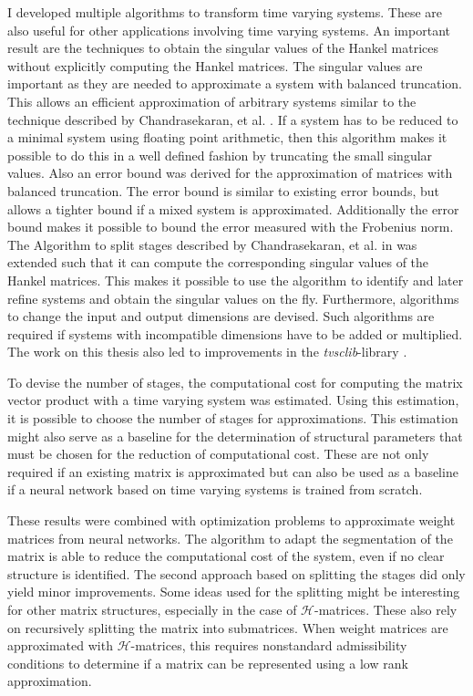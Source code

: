 \documentclass[numbers=noenddot,doctype=mastersthesis,BCOR=15mm,biblatex]{ldvbook}%
\begin{document}
I developed multiple algorithms to transform time varying systems.
These are also useful for other applications involving time varying systems.
An important result are the techniques to obtain the singular values of the Hankel matrices without explicitly computing the Hankel matrices.
The singular values are important as they are needed to approximate a system with balanced truncation.
This allows an efficient approximation of arbitrary systems similar to the technique described by Chandrasekaran, et al. \cite{chandrasekaran_fast_2005}.
If a system has to be reduced to a minimal system using floating point arithmetic, then this algorithm makes it possible to do this in a well defined fashion by truncating the small singular values.
Also an error bound was derived for the approximation of matrices with balanced truncation.
The error bound is similar to existing error bounds, but allows a tighter bound if a mixed system is approximated.
Additionally the error bound makes it possible to bound the error measured with the Frobenius norm.
The Algorithm to split stages described by Chandrasekaran, et al. in \cite{chandrasekaran_fast_2005} was extended such that it can compute the corresponding singular values of the Hankel matrices.
This makes it possible to use the algorithm to identify and later refine systems and obtain the singular values on the fly.
Furthermore, algorithms to change the input and output dimensions are devised. 
Such algorithms are required if systems with incompatible dimensions have to be added or multiplied.
The work on this thesis also led to improvements in the \emph{tvsclib}-library \cite{kissel_time_2022}.

To devise the number of stages, the computational cost for computing the matrix vector product with a time varying system was estimated.
Using this estimation, it is possible to choose the number of stages for approximations.
This estimation might also serve as a baseline for the determination of structural parameters that must be chosen for the reduction of computational cost.
These are not only required if an existing matrix is approximated 
but can also be used as a baseline if a neural network based on time varying systems is trained from scratch.

These results were combined with optimization problems to approximate weight matrices from neural networks.
The algorithm to adapt the segmentation of the matrix is able to reduce the computational cost of the system, even if no clear structure is identified.
The second approach based on splitting the stages did only yield minor improvements.
Some ideas used for the splitting might be interesting for other matrix structures,
especially in the case of $\mathcal{H}$-matrices.
These also rely on recursively splitting the matrix into submatrices.
When weight matrices are approximated with $\mathcal{H}$-matrices, this requires nonstandard admissibility conditions to determine if a matrix can be represented using a low rank approximation.
\end{document}
